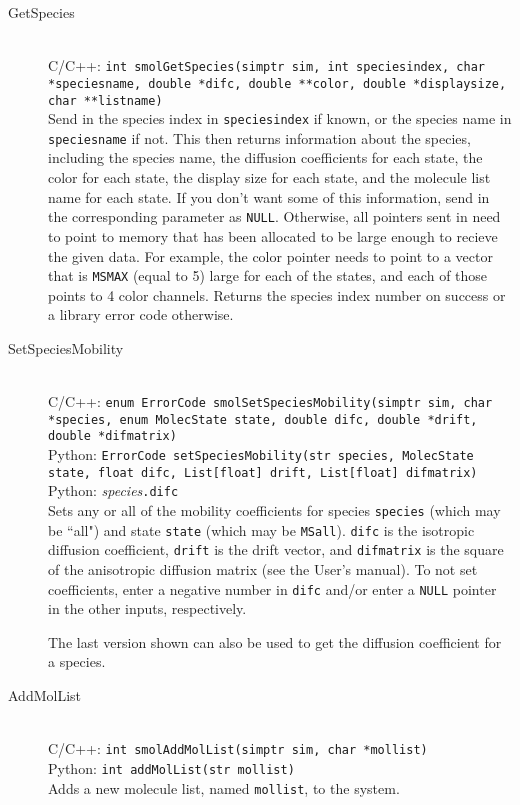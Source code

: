 \documentclass {scrbook}
\newcommand {\ttt} {\texttt}
\begin{document}
\begin{description}
\item[GetSpecies]
\hfill \\
C/C++: \ttt{int smolGetSpecies(simptr sim, int speciesindex, char *speciesname, double *difc, double **color, double *displaysize, char **listname)}\\
Send in the species index in \ttt{speciesindex} if known, or the species name in \ttt{speciesname} if not. This then returns information about the species, including the species name, the diffusion coefficients for each state, the color for each state, the display size for each state, and the molecule list name for each state. If you don't want some of this information, send in the corresponding parameter as \ttt{NULL}. Otherwise, all pointers sent in need to point to memory that has been allocated to be large enough to recieve the given data. For example, the color pointer needs to point to a vector that is \ttt{MSMAX} (equal to 5) large for each of the states, and each of those points to 4 color channels. Returns the species index number on success or a library error code otherwise.

\item[SetSpeciesMobility]
\hfill \\
C/C++: \ttt{enum ErrorCode smolSetSpeciesMobility(simptr sim, char *species, enum MolecState state, double difc, double *drift, double *difmatrix)}\\
Python: \ttt{ErrorCode setSpeciesMobility(str species, MolecState state, float difc, List[float] drift, List[float] difmatrix)}\\
Python: \textit{species}\ttt{.difc}\\
Sets any or all of the mobility coefficients for species \ttt{species} (which may be ``all") and state \ttt{state} (which may be \ttt{MSall}). \ttt{difc} is the isotropic diffusion coefficient, \ttt{drift} is the drift vector, and \ttt{difmatrix} is the square of the anisotropic diffusion matrix (see the User's manual). To not set coefficients, enter a negative number in \ttt{difc} and/or enter a \ttt{NULL} pointer in the other inputs, respectively.

The last version shown can also be used to get the diffusion coefficient for a species.


\item[AddMolList]
\hfill \\
C/C++: \ttt{int smolAddMolList(simptr sim, char *mollist)}\\
Python: \ttt{int addMolList(str mollist)}\\
Adds a new molecule list, named \ttt{mollist}, to the system.


\end{description}
\end{document}
